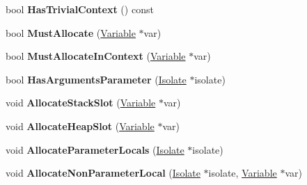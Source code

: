 \begin{DoxyCompactItemize}
\item 
bool {\bfseries Has\+Trivial\+Context} () const \hypertarget{classv8_1_1internal_1_1_scope_a3b8d0a35414fea4bb389a228631a1da4}{}\label{classv8_1_1internal_1_1_scope_a3b8d0a35414fea4bb389a228631a1da4}

\item 
bool {\bfseries Must\+Allocate} (\hyperlink{classv8_1_1internal_1_1_variable}{Variable} $\ast$var)\hypertarget{classv8_1_1internal_1_1_scope_ace80ba20403956a4ac174a7e44eb47bd}{}\label{classv8_1_1internal_1_1_scope_ace80ba20403956a4ac174a7e44eb47bd}

\item 
bool {\bfseries Must\+Allocate\+In\+Context} (\hyperlink{classv8_1_1internal_1_1_variable}{Variable} $\ast$var)\hypertarget{classv8_1_1internal_1_1_scope_a7b2293179db997cf4398e46b77b44213}{}\label{classv8_1_1internal_1_1_scope_a7b2293179db997cf4398e46b77b44213}

\item 
bool {\bfseries Has\+Arguments\+Parameter} (\hyperlink{classv8_1_1internal_1_1_isolate}{Isolate} $\ast$isolate)\hypertarget{classv8_1_1internal_1_1_scope_aaeff7988fe65685004da550440ab51bb}{}\label{classv8_1_1internal_1_1_scope_aaeff7988fe65685004da550440ab51bb}

\item 
void {\bfseries Allocate\+Stack\+Slot} (\hyperlink{classv8_1_1internal_1_1_variable}{Variable} $\ast$var)\hypertarget{classv8_1_1internal_1_1_scope_a765d63a4936a0993deb5934a20dfb0c3}{}\label{classv8_1_1internal_1_1_scope_a765d63a4936a0993deb5934a20dfb0c3}

\item 
void {\bfseries Allocate\+Heap\+Slot} (\hyperlink{classv8_1_1internal_1_1_variable}{Variable} $\ast$var)\hypertarget{classv8_1_1internal_1_1_scope_a03c32bfa8205b464b1630479f9e91679}{}\label{classv8_1_1internal_1_1_scope_a03c32bfa8205b464b1630479f9e91679}

\item 
void {\bfseries Allocate\+Parameter\+Locals} (\hyperlink{classv8_1_1internal_1_1_isolate}{Isolate} $\ast$isolate)\hypertarget{classv8_1_1internal_1_1_scope_ad8a8e7844af4ef6f1c15c986e1958881}{}\label{classv8_1_1internal_1_1_scope_ad8a8e7844af4ef6f1c15c986e1958881}

\item 
void {\bfseries Allocate\+Non\+Parameter\+Local} (\hyperlink{classv8_1_1internal_1_1_isolate}{Isolate} $\ast$isolate, \hyperlink{classv8_1_1internal_1_1_variable}{Variable} $\ast$var)\hypertarget{classv8_1_1internal_1_1_scope_acf6d730d5e87294e03af66124ea1365e}{}\label{classv8_1_1internal_1_1_scope_acf6d730d5e87294e03af66124ea1365e}


\end{DoxyCompactItemize}
